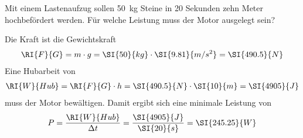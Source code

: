 
\begin{aufgabe}
	Mit einem Lastenaufzug sollen \SI{50}{kg} Steine in 20 Sekunden zehn Meter hochbefördert werden.
	Für welche Leistung muss der Motor ausgelegt sein?
	\begin{loesung}
		Die Kraft ist die Gewichtskraft
		\begin{eqnarray*}
			\RI{F}{G}=m\cdot g=\SI{50}{kg}\cdot\SI{9.81}{m/s^2}=\SI{490.5}{N}
		\end{eqnarray*}
		Eine Hubarbeit von
		\begin{eqnarray*}
			\RI{W}{Hub}=\RI{F}{G}\cdot h=\SI{490.5}{N}\cdot\SI{10}{m}=\SI{4905}{J}
		\end{eqnarray*}
muss der Motor bewältigen.
Damit ergibt sich eine minimale Leistung von
\begin{eqnarray*}
	P=\frac{\RI{W}{Hub}}{\Delta t}=\frac{\SI{4905}{J}}{\SI{20}{s}}=\SI{245.25}{W}
\end{eqnarray*}
	\end{loesung}
\end{aufgabe}

